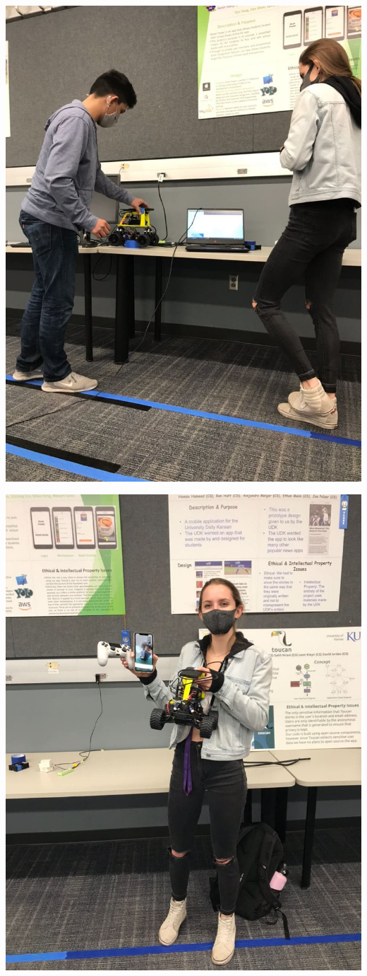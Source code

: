 \documentclass[11pt]{article}
\begin{document}
\begin{enumerate}
\begin{center}
\includegraphics[width=.9\linewidth]{./bluetooth_1.jpg}
\end{center}

\begin{center}
\includegraphics[width=.9\linewidth]{./bluetooth_2.jpg}
\end{center}
\end{enumerate}
\end{document}
